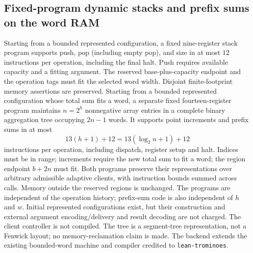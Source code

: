 \begin{result}
\subsection{Fixed-program dynamic stacks and prefix sums on the word RAM}
Starting from a bounded represented configuration, a fixed nine-register stack program supports
push, pop (including empty pop), and size in
at most $12$ instructions per operation, including the final halt. Push requires available
capacity and a fitting argument. The reserved base-plus-capacity endpoint and the operation tags
must fit the selected word width. Disjoint finite-footprint memory assertions are preserved.
Starting from a bounded represented configuration whose total sum fits a word, a separate fixed
fourteen-register program maintains $n=2^h$ nonnegative array entries in a
complete binary aggregation tree occupying $2n-1$ words. It supports point increments and prefix
sums in at most
\[
 13(h+1)+12=13(\log_2 n+1)+12
\]
instructions per operation, including dispatch, register setup and halt. Indices must be in range;
increments require the new total sum to fit a word; the region endpoint $b+2n$ must fit.
Both programs preserve their representations over arbitrary admissible adaptive clients, with
instruction bounds summed across calls. Memory outside the reserved regions is unchanged.
The programs are independent of the operation history; prefix-sum code is also independent of
$h$ and $w$. Initial represented configurations exist, but their construction and external
argument encoding/delivery and result decoding are not charged. The client controller is not
compiled. The tree is a segment-tree representation, not a Fenwick layout; no memory-reclamation
claim is made. The backend extends the existing bounded-word machine and compiler credited to
\texttt{lean-trominoes}.\citep{CLRS2009,Tromino2025,Reynolds2002}
\end{result}

